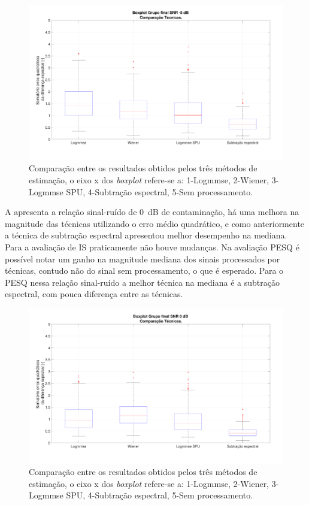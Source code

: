 \begin{figure}[H]
\centering
\includegraphics[width=1\linewidth]{Figs/Total_m5}
\caption{Comparação entre os resultados obtidos pelos três métodos de estimação, o eixo x dos \textit{boxplot} refere-se a: 1-Logmmse, 2-Wiener, 3-Logmmse SPU, 4-Subtração espectral, 5-Sem processamento.}
\label{q2}
\end{figure}

A  apresenta a relação sinal-ruído de 0~dB de contaminação, há uma melhora na magnitude das técnicas utilizando o erro médio quadrático, e como anteriormente a técnica de subtração espectral apresentou melhor desempenho na mediana. Para a avaliação de IS praticamente não houve mudanças. Na avaliação PESQ é possível notar um ganho na magnitude mediana dos sinais processados por técnicas, contudo não do sinal sem processamento, o que é esperado. Para o PESQ nessa relação sinal-ruído a melhor técnica na mediana é a subtração espectral, com pouca diferença entre as técnicas.

\begin{figure}[H]
\centering
\includegraphics[width=1\linewidth]{Figs/Total_0}
\caption{Comparação entre os resultados obtidos pelos três métodos de estimação, o eixo x dos \textit{boxplot} refere-se a: 1-Logmmse, 2-Wiener, 3-Logmmse SPU, 4-Subtração espectral, 5-Sem processamento.}
\label{q3}
\end{figure}

